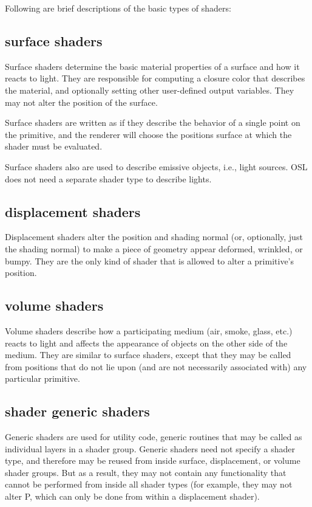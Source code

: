 \documentclass[11pt,letterpaper]{book}
\def\P{{\cf P}\xspace}
\def\colorclosure{{\cf closure color}\xspace}
\begin{document}
Following are brief descriptions of the basic types of shaders:


\subsection*{{\cf surface} shaders}

Surface shaders determine the basic material properties of a surface and
how it reacts to light.  They are responsible for computing a
\colorclosure that describes the material, and optionally setting
other user-defined output variables.  They may not alter
the position of the surface.

Surface shaders are written as if they describe the behavior of a single
point on the primitive, and the renderer will choose the positions
surface at which the shader must be evaluated.

Surface shaders also are used to describe emissive objects, i.e., light
sources.  OSL does not need a separate shader type to describe lights.

\subsection*{{\cf displacement} shaders}

Displacement shaders alter the position and shading normal (or,
optionally, just the shading normal) to make a piece of geometry appear
deformed, wrinkled, or bumpy.  They are the only kind of shader that
is allowed to alter a primitive's position.

\subsection*{{\cf volume} shaders}

Volume shaders describe how a participating medium (air, smoke, glass,
etc.) reacts to light and affects the appearance of objects on the other
side of the medium.  They are similar to {\cf surface} shaders, except
that they may be called from positions that do not lie upon (and are not
necessarily associated with) any particular primitive.



\subsection*{{\cf shader} generic shaders}

Generic shaders are used for utility code, generic routines that may be
called as individual layers in a shader group.  Generic shaders need not
specify a shader type, and therefore may be reused from inside surface,
displacement, or volume shader groups.  But as a result, they may
not contain any functionality that cannot be performed from inside all
shader types (for example, they may not alter \P, which can only be done
from within a displacement shader).
\end{document}
